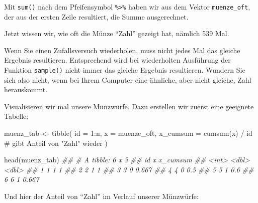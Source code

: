 \documentclass[
  a4paper,
  DIV=11]{scrreprt}
\newenvironment{Shaded}{\begin{snugshade}}{\end{snugshade}}
\newcommand{\AttributeTok}[1]{\textcolor[rgb]{0.40,0.45,0.13}{#1}}
\newcommand{\CommentTok}[1]{\textcolor[rgb]{0.37,0.37,0.37}{#1}}
\newcommand{\DecValTok}[1]{\textcolor[rgb]{0.68,0.00,0.00}{#1}}
\newcommand{\DocumentationTok}[1]{\textcolor[rgb]{0.37,0.37,0.37}{\textit{#1}}}
\newcommand{\FunctionTok}[1]{\textcolor[rgb]{0.28,0.35,0.67}{#1}}
\newcommand{\NormalTok}[1]{\textcolor[rgb]{0.00,0.23,0.31}{#1}}
\newcommand{\OtherTok}[1]{\textcolor[rgb]{0.00,0.23,0.31}{#1}}
\newcommand{\SpecialCharTok}[1]{\textcolor[rgb]{0.37,0.37,0.37}{#1}}
\theoremstyle{definition}
\theoremstyle{remark}
\begin{document}
Mit \texttt{sum()} nach dem Pfeifensymbol \texttt{\%\textgreater{}\%}
haben wir aus dem Vektor \texttt{muenze\_oft}, der aus der ersten Zeile
resultiert, die Summe ausgerechnet.

Jetzt wissen wir, wie oft die Münze ``Zahl'' gezeigt hat, nämlich 539
Mal.

\begin{tcolorbox}[enhanced jigsaw, colframe=quarto-callout-note-color-frame, title=\textcolor{quarto-callout-note-color}{\faInfo}\hspace{0.5em}{Hinweis}, breakable, leftrule=.75mm, coltitle=black, toptitle=1mm, bottomrule=.15mm, bottomtitle=1mm, opacityback=0, arc=.35mm, rightrule=.15mm, left=2mm, colbacktitle=quarto-callout-note-color!10!white, opacitybacktitle=0.6, toprule=.15mm, titlerule=0mm, colback=white]
Wenn Sie einen Zufallsversuch wiederholen, muss nicht jedes Mal das
gleiche Ergebnis resultieren. Entsprechend wird bei wiederholten
Ausführung der Funktion \texttt{sample()} nicht immer das gleiche
Ergebnis resultieren. Wundern Sie sich also nicht, wenn bei Ihrem
Computer eine ähnliche, aber nicht gleiche, Zahl herauskommt.
\end{tcolorbox}

Visualisieren wir mal unsere Münzwürfe. Dazu erstellen wir zuerst eine
geeignete Tabelle:

\begin{Shaded}
\begin{Highlighting}[]
\NormalTok{muenz\_tab }\OtherTok{\textless{}{-}}
  \FunctionTok{tibble}\NormalTok{(}
    \AttributeTok{id =} \DecValTok{1}\SpecialCharTok{:}\NormalTok{n,}
    \AttributeTok{x =}\NormalTok{ muenze\_oft,}
    \AttributeTok{x\_cumsum =} \FunctionTok{cumsum}\NormalTok{(x) }\SpecialCharTok{/}\NormalTok{ id  }\CommentTok{\# gibt Anteil von "Zahl" wieder}
\NormalTok{  )}

\FunctionTok{head}\NormalTok{(muenz\_tab)}
\DocumentationTok{\#\# \# A tibble: 6 x 3}
\DocumentationTok{\#\#      id     x x\_cumsum}
\DocumentationTok{\#\#   \textless{}int\textgreater{} \textless{}dbl\textgreater{}    \textless{}dbl\textgreater{}}
\DocumentationTok{\#\# 1     1     1    1    }
\DocumentationTok{\#\# 2     2     1    1    }
\DocumentationTok{\#\# 3     3     0    0.667}
\DocumentationTok{\#\# 4     4     0    0.5  }
\DocumentationTok{\#\# 5     5     1    0.6  }
\DocumentationTok{\#\# 6     6     1    0.667}
\end{Highlighting}
\end{Shaded}

Und hier der Anteil von ``Zahl'' im Verlauf unserer Münzwürfe:
\end{document}
